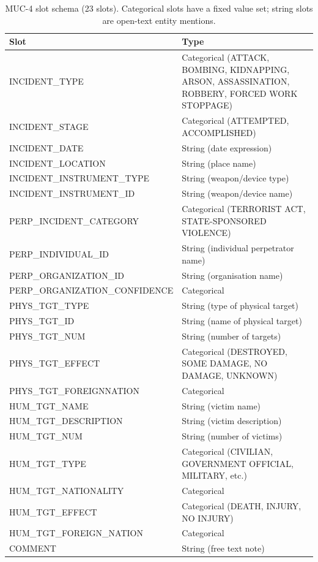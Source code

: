 \documentclass[11pt,a4paper]{article}
\begin{document}
\begin{table}[h]
\centering
\caption{MUC-4 slot schema (23 slots). Categorical slots have a fixed value set; string slots are open-text entity mentions.}
\label{tab:muc4_slots}
\small
\begin{tabular}{ll}
\toprule
\textbf{Slot} & \textbf{Type} \\
\midrule
INCIDENT\_TYPE & Categorical (ATTACK, BOMBING, KIDNAPPING, ARSON, ASSASSINATION, ROBBERY, FORCED WORK STOPPAGE) \\
INCIDENT\_STAGE & Categorical (ATTEMPTED, ACCOMPLISHED) \\
INCIDENT\_DATE & String (date expression) \\
INCIDENT\_LOCATION & String (place name) \\
INCIDENT\_INSTRUMENT\_TYPE & String (weapon/device type) \\
INCIDENT\_INSTRUMENT\_ID & String (weapon/device name) \\
PERP\_INCIDENT\_CATEGORY & Categorical (TERRORIST ACT, STATE-SPONSORED VIOLENCE) \\
PERP\_INDIVIDUAL\_ID & String (individual perpetrator name) \\
PERP\_ORGANIZATION\_ID & String (organisation name) \\
PERP\_ORGANIZATION\_CONFIDENCE & Categorical \\
PHYS\_TGT\_TYPE & String (type of physical target) \\
PHYS\_TGT\_ID & String (name of physical target) \\
PHYS\_TGT\_NUM & String (number of targets) \\
PHYS\_TGT\_EFFECT & Categorical (DESTROYED, SOME DAMAGE, NO DAMAGE, UNKNOWN) \\
PHYS\_TGT\_FOREIGNNATION & Categorical \\
HUM\_TGT\_NAME & String (victim name) \\
HUM\_TGT\_DESCRIPTION & String (victim description) \\
HUM\_TGT\_NUM & String (number of victims) \\
HUM\_TGT\_TYPE & Categorical (CIVILIAN, GOVERNMENT OFFICIAL, MILITARY, etc.) \\
HUM\_TGT\_NATIONALITY & Categorical \\
HUM\_TGT\_EFFECT & Categorical (DEATH, INJURY, NO INJURY) \\
HUM\_TGT\_FOREIGN\_NATION & Categorical \\
COMMENT & String (free text note) \\
\bottomrule
\end{tabular}
\end{table}
\end{document}
